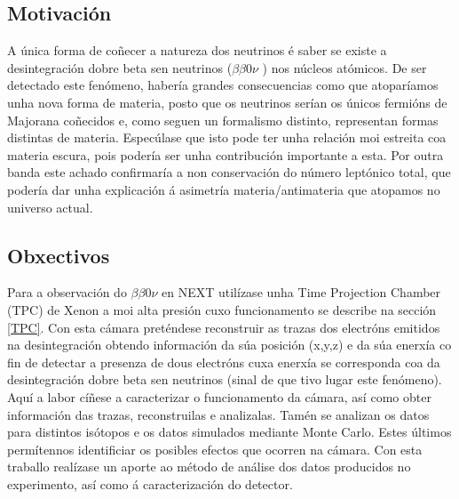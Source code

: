 \documentclass[a4paper,12pt]{article}
\newcommand{\bbcn}[0]{$\beta\beta0\nu$ }
\begin{document}
\subsection{Motivación}\label{motivacion}

A única forma de coñecer a natureza dos neutrinos é saber se existe a desintegración dobre beta sen neutrinos (\bbcn) nos núcleos atómicos. De ser detectado este fenómeno, habería grandes consecuencias como que atoparíamos unha nova forma de materia, posto que os neutrinos serían os únicos fermións de Majorana coñecidos e, como seguen un formalismo distinto, representan formas distintas de materia. Especúlase que isto pode ter unha relación moi estreita coa materia escura, pois podería ser unha contribución importante a esta. Por outra banda este achado confirmaría a non conservación do número leptónico total, que podería dar unha explicación á asimetría materia/antimateria que atopamos no universo actual. %


\subsection{Obxectivos}\label{obxectivos}
Para a observación do \bbcn en NEXT utilízase unha Time Projection Chamber (TPC) de Xenon a moi alta presión cuxo funcionamento se describe na sección \ref{TPC}. Con esta cámara preténdese reconstruir as trazas dos electróns emitidos na desintegración obtendo información da súa posición (x,y,z) e da súa enerxía co fin de detectar a presenza de dous electróns cuxa enerxía se corresponda coa da desintegración dobre beta sen neutrinos (sinal de que tivo lugar este fenómeno). Aquí a labor cíñese a caracterizar o funcionamento da cámara, así como obter información das trazas, reconstruilas e analizalas. Tamén se analizan os datos para distintos isótopos e os datos simulados mediante Monte Carlo. Estes últimos permítennos identificiar os posibles efectos que ocorren na cámara. Con esta traballo realízase un aporte ao método de análise dos datos producidos no experimento, así como á caracterización do detector.
\end{document}
